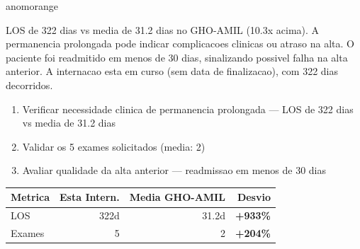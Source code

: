 \documentclass[a4paper,10pt]{article}
\begin{document}
\begin{anomalycard}[Internacao 3677 | GHO-AMIL | ALTO (z=3.46)]{anomorange}
\vspace{2pt}\begin{tcolorbox}[colback=severityred!20,colframe=anomorange,title={\textbf{Interpretacao de Negocio}},fonttitle=\bfseries\small,left=4pt,right=4pt,top=3pt,bottom=3pt]
{\small LOS de 322 dias vs media de 31.2 dias no GHO-AMIL (10.3x acima). A permanencia prolongada pode indicar complicacoes clinicas ou atraso na alta. O paciente foi readmitido em menos de 30 dias, sinalizando possivel falha na alta anterior. A internacao esta em curso (sem data de finalizacao), com 322 dias decorridos.}
\end{tcolorbox}
\begin{tcolorbox}[colback=severityyellow!30,colframe=anomorange,title={\textbf{Recomendacoes Especificas}},fonttitle=\bfseries\small,left=4pt,right=4pt,top=3pt,bottom=3pt]
\begin{enumerate}[nosep,leftmargin=16pt]
\item {\small Verificar necessidade clinica de permanencia prolongada --- LOS de 322 dias vs media de 31.2 dias}
\item {\small Validar os 5 exames solicitados (media: 2)}
\item {\small Avaliar qualidade da alta anterior --- readmissao em menos de 30 dias}
\end{enumerate}
\end{tcolorbox}
\begin{center}\begin{tabular}{l r r r}\toprule\textbf{Metrica} & \textbf{Esta Intern.} & \textbf{Media GHO-AMIL} & \textbf{Desvio} \\\midrule
LOS & 322d & 31.2d & \textcolor{anomred}{\textbf{+933\%}} \\
Exames & 5 & 2 & \textcolor{anomred}{\textbf{+204\%}} \\
\bottomrule\end{tabular}\end{center}


\end{anomalycard}
\end{document}
